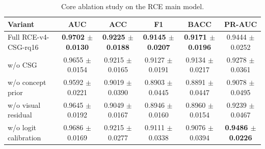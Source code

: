 \begin{table}[t]
\centering
\caption{Core ablation study on the RCE main model.}
\label{tab:stage52b-rce-ablation}
\begin{tabular}{lccccc}
\hline
Variant & AUC & ACC & F1 & BACC & PR-AUC \\
\hline
Full RCE-v4-CSG-rq16 & \textbf{0.9702 $\pm$ 0.0130} & \textbf{0.9225 $\pm$ 0.0188} & \textbf{0.9145 $\pm$ 0.0207} & \textbf{0.9171 $\pm$ 0.0196} & 0.9444 $\pm$ 0.0252 \\
w/o CSG & 0.9655 $\pm$ 0.0154 & 0.9215 $\pm$ 0.0165 & 0.9127 $\pm$ 0.0191 & 0.9134 $\pm$ 0.0217 & 0.9278 $\pm$ 0.0361 \\
w/o concept prior & 0.9592 $\pm$ 0.0221 & 0.9019 $\pm$ 0.0390 & 0.8903 $\pm$ 0.0445 & 0.8891 $\pm$ 0.0447 & 0.9078 $\pm$ 0.0495 \\
w/o visual residual & 0.9645 $\pm$ 0.0192 & 0.9049 $\pm$ 0.0167 & 0.8946 $\pm$ 0.0160 & 0.8960 $\pm$ 0.0154 & 0.9239 $\pm$ 0.0467 \\
w/o logit calibration & 0.9686 $\pm$ 0.0169 & 0.9215 $\pm$ 0.0277 & 0.9111 $\pm$ 0.0338 & 0.9076 $\pm$ 0.0394 & \textbf{0.9486 $\pm$ 0.0226} \\
\hline
\end{tabular}
\end{table}

